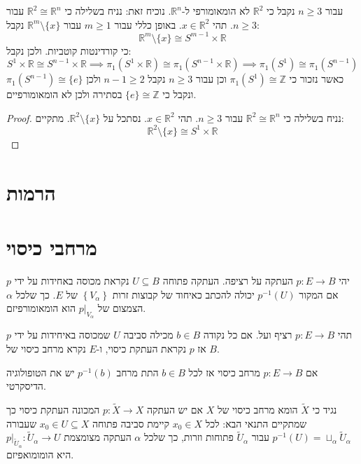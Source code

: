 \documentclass{tstextbook}
\begin{document}
\begin{example}
עבור \(n\geq 3\) נקבל כי \(\mathbb{R}^{2}\) לא הומאומורפי ל-\(\mathbb{R}^{n}\). נוכיח זאת:
נניח בשלילה כי \(\mathbb{R}^{2}\cong \mathbb{R}^{n}\) עבור \(n\geq 3\). תהי \(x\in \mathbb{R}^{2}\). באופן כללי עבור \(m \geq 1\) עבור \(\mathbb{R}^{m}\setminus \{x \}\) נקבל:
$$\mathbb{R}^{m}\setminus \{ x \}\cong S^{m-1}\times \mathbb{R}$$
כי קורדינטות קוטביות. ולכן נקבל:
$$S^{1}\times \mathbb{R}\cong S^{n-1}\times \mathbb{R}\implies \pi_{1}\left( S^{1}\times \mathbb{R} \right)\cong \pi_{1}\left( S^{n-1}\times \mathbb{R} \right)\implies \pi_{1}(S^{1})\cong \pi_{1}(S^{n-1})$$
כאשר נזכור כי \(\pi_{1}(S^{1})\cong\mathbb{Z}\) וכן עבור \(n\geq 3\) נקבל \(n-1\geq 2\) ולכן \(\pi_{1}(S^{n-1})\cong\{ e \}\) ונקבל כי \(\{ e \}\cong \mathbb{Z}\) בסתירה ולכן לא הומאומורפיים.

\end{example}
\begin{proof}
נניח בשלילה כי \(\mathbb{R}^{2}\cong \mathbb{R}^{n}\) עבור \(n\geq 3\). תהי \(x\in \mathbb{R}^{2}\). נסתכל על \(\mathbb{R}^{2}\setminus \{x \}\). מתקיים:
$$\mathbb{R}^{2}\setminus \{ x \}\cong S^{1}\times \mathbb{R}$$

\end{proof}
\section{הרמות}

\section{מרחבי כיסוי}

\begin{definition}
יהי \(p:E\to B\) העתקה על רציפה. העתקה פתוחה \(U\subseteq B\) נקראת מכוסה באחידות על ידי \(p\) אם המקור \(p ^{-1}(U)\) יכולה להכתב כאיחוד של קבוצות זרות \(\left\{  V_{\alpha}  \right\}\) של \(E\). כך שלכל \(\alpha\) הצמצום של \(p|_{V_{\alpha}}\) הוא הומאומורפיזם.

\end{definition}
\begin{definition}
תהי \(p:E\to B\) רציף ועל. אם כל נקודה \(b \in B\) מכילה סביבה \(U\) שמכוסה באיחידות על ידי \(p\) אז \(p\) נקראת העתקת כיסוי, ו-\(E\) נקרא מרחב כיסוי של \(B\).

\end{definition}
\begin{remark}
אם \(p:E\to B\) מרחב כיסוי אז לכל \(b \in B\) התת מרחב \(p ^{-1}(b)\) יש את הטופולוגיה הדיסקרטי. 

\end{remark}
\begin{definition}
נגיד כי \(\tilde{X}\) הומא מרחב כיסוי של \(X\) אם יש העתקה \(p:\tilde{X}\to X\) המכונה העתקת כיסוי כך שמתקיים התנאי הבא:
לכל \(x_{0} \in X\) קיימת סביבה פתוחה \(x_{0} \in U\subseteq X\) שעבורה \(p ^{-1}(U)=\sqcup_{\alpha}\tilde{U}_{\alpha}\) עבור \(\tilde{U}_{\alpha}\) פתוחות וזרות, כך שלכל \(\alpha\) העתקה מצומצמת \(p|_{\tilde{U}_{\alpha}}:\tilde{U}_{\alpha}\to U\)  היא הומומואפיזם.

\end{definition}
\end{document}
